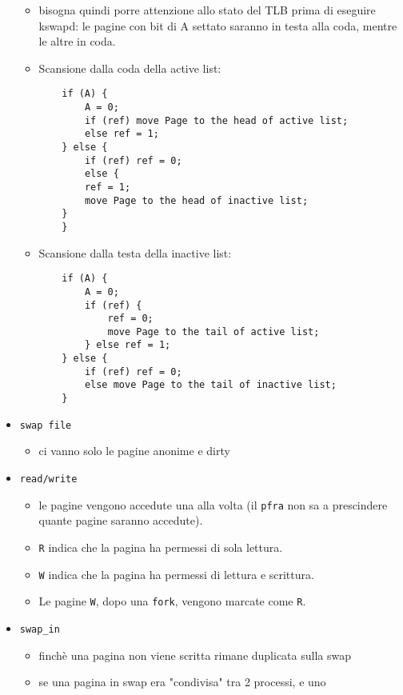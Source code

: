 \documentclass[12pt, a4paper]{report}
\begin{document}
\begin{itemize}
\begin{itemize}
		      \item bisogna quindi porre attenzione allo stato del TLB prima di
		            eseguire kswapd: le pagine con bit di A settato saranno in testa
		            alla coda, mentre le altre in coda.
		      \item Scansione dalla coda della active list:
		            \begin{verbatim}
    if (A) {
        A = 0;
        if (ref) move Page to the head of active list;
        else ref = 1;
    } else {
        if (ref) ref = 0;
        else {
	    ref = 1;
	    move Page to the head of inactive list;
	}
    }
				\end{verbatim}
		      \item Scansione dalla testa della inactive list:
		            \begin{verbatim}
    if (A) {
        A = 0;
        if (ref) {
            ref = 0;
            move Page to the tail of active list;
        } else ref = 1;
    } else {
        if (ref) ref = 0;
        else move Page to the tail of inactive list;
    }
				\end{verbatim}
	      \end{itemize}
	\item \texttt{swap file}
	      \begin{itemize}
		      \item ci vanno solo le pagine anonime e dirty
	      \end{itemize}
	\item \texttt{read/write}
	      \begin{itemize}
		      \item le pagine vengono accedute una alla volta (il \texttt{pfra}
		            non sa a prescindere quante pagine saranno accedute).
		      \item \texttt{R} indica che la pagina ha permessi di
		            sola lettura.
		      \item \texttt{W} indica che la pagina ha permessi di
		            lettura e scrittura.
		      \item  Le pagine \texttt{W}, dopo una \texttt{fork}, vengono marcate
		            come \texttt{R}.
	      \end{itemize}
	\item \texttt{swap\_in}
	      \begin{itemize}
		      \item finchè una pagina non viene scritta rimane duplicata sulla
		            swap
		      \item se una pagina in swap era "condivisa" tra 2 processi, e uno

\end{itemize}
\end{itemize}
\end{document}
